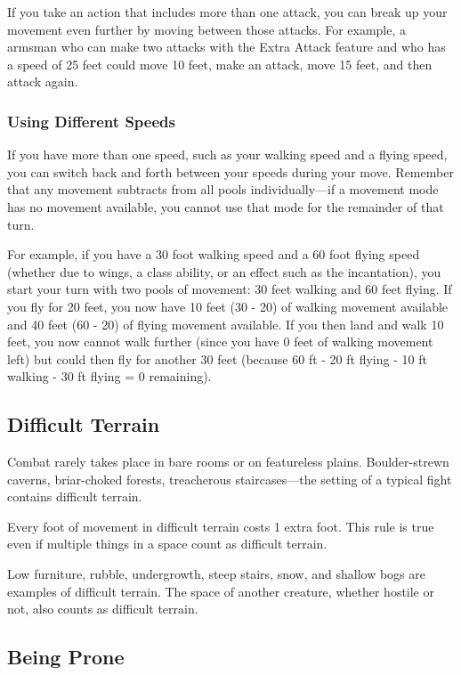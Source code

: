 If you take an action that includes more than one attack, you can break up your movement even further by moving between those attacks. For example, a armsman who can make two attacks with the Extra Attack feature and who has a speed of 25 feet could move 10 feet, make an attack, move 15 feet, and then attack again.

\subsubsection{Using Different Speeds}

If you have more than one speed, such as your walking speed and a flying speed, you can switch back and forth between your speeds during your move. Remember that any movement subtracts from all pools individually---if a movement mode has no movement available, you cannot use that mode for the remainder of that turn.

For example, if you have a 30 foot walking speed and a 60 foot flying speed (whether due to wings, a class ability, or an effect such as the  incantation), you start your turn with two pools of movement: 30 feet walking and 60 feet flying. If you fly for 20 feet, you now have 10 feet (30 - 20) of walking movement available and 40 feet (60 - 20) of flying movement available. If you then land and walk 10 feet, you now cannot walk further (since you have 0 feet of walking movement left) but could then fly for another 30 feet (because 60 ft - 20 ft flying - 10 ft walking - 30 ft flying = 0 remaining).

\subsection{Difficult Terrain}

Combat rarely takes place in bare rooms or on featureless plains. Boulder-strewn caverns, briar-choked forests, treacherous staircases---the setting of a typical fight contains difficult terrain.

Every foot of movement in difficult terrain costs 1 extra foot. This rule is true even if multiple things in a space count as difficult terrain.

Low furniture, rubble, undergrowth, steep stairs, snow, and shallow bogs are examples of difficult terrain. The space of another creature, whether hostile or not, also counts as difficult terrain.

\subsection{Being Prone}

